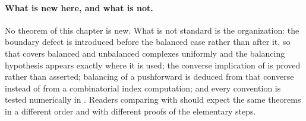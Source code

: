 \paragraph{What is new here, and what is not.}
No theorem of this chapter is new.  What is not standard is the
organization: the boundary defect is introduced before the balanced case
rather than after it, so that
 covers balanced and unbalanced complexes
uniformly and the balancing hypothesis appears exactly where it is used;
the converse implication of  is proved
rather than asserted; balancing of a pushforward is deduced from that
converse instead of from a combinatorial index computation; and every
convention is tested numerically in .  Readers
comparing with \cite[\S\S4.6 and 5.9--5.11]{CLD25} should expect the same
theorems in a different order and with different proofs of the elementary
steps.
